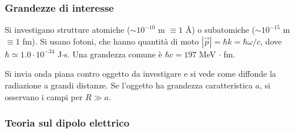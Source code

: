 \documentclass[10pt, a4paper]{scrartcl}
\numberwithin{equation}{subsection}
\theoremstyle{style1}
\begin{document}
\subsubsection{Grandezze di interesse}

Si investigano strutture atomiche ($\sim 10^{-10} $ m $\equiv 1$ \r{A}) o subatomiche ($\sim 10^{-15} $ m $\equiv 1$ fm). Si usano fotoni, che hanno quantit\`a di moto  $\left\lvert \vec{p} \right\rvert  = \hbar k = \hbar \omega / c$, dove $\hbar  \simeq 1.0 \cdot 10^{-34} $ J$\cdot $s. Una grandezza comune \`e $\hbar  c = 197$ MeV $\cdot $ fm.

Si invia onda piana contro oggetto da investigare e si vede come diffonde la radiazione a grandi distanze. Se l'oggetto ha grandezza caratteristica $a$, si osservano i campi per $R \gg a$.

\subsubsection{Teoria sul dipolo elettrico}
\end{document}
